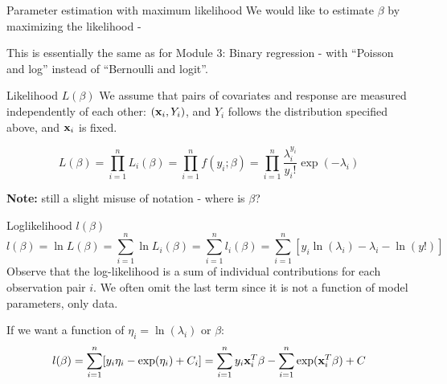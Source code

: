 \documentclass[
  ignorenonframetext,
]{beamer}
\begin{document}
\begin{frame}{Parameter estimation with maximum likelihood}
\label{parameter-estimation-with-maximum-likelihood}
We would like to estimate \(\beta\) by maximizing the likelihood -

This is essentially the same as for Module 3: Binary regression - with
``Poisson and log'' instead of ``Bernoulli and logit''.
\end{frame}

\begin{frame}
\begin{block}{Likelihood \(L(\beta)\)}
\label{likelihood-lbeta}
We assume that pairs of covariates and response are measured
independently of each other: \(({\bf x}_i,Y_i)\), and \(Y_i\) follows
the distribution specified above, and \({\bf x}_i\) is fixed.

\[L(\beta)=\prod_{i=1}^n L_i(\beta)=\prod_{i=1}^n f(y_i; \beta)=\prod_{i=1}^n\frac{\lambda_i^{y_i}}{y_i!}\exp(-\lambda_i)\]

\textbf{Note:} still a slight misuse of notation - where is \(\beta\)?
\end{block}
\end{frame}

\begin{frame}
\begin{block}{Loglikelihood \(l(\beta)\)}
\label{loglikelihood-lbeta}
\[l(\beta)=\ln L(\beta)=\sum_{i=1}^n \ln L_i(\beta)=\sum_{i=1}^n l_i(\beta)=\sum_{i=1}^n [y_i \ln(\lambda_i)-\lambda_i-\ln(y!)]\]
Observe that the log-likelihood is a sum of individual contributions for
each observation pair \(i\). We often omit the last term since it is not
a function of model parameters, only data.
\end{block}
\end{frame}

\begin{frame}
If we want a function of \(\eta_i=\ln(\lambda_i)\) or \(\beta\):
\[l(\beta)=\sum_{i=1}^n[y_i \eta_i-\exp(\eta_i)+C_i]=\sum_{i=1}^n y_i{\bf x}_i^T\beta-\sum_{i=1}^n  \exp({\bf x}_i^T\beta) +C\]
\end{frame}
\end{document}
